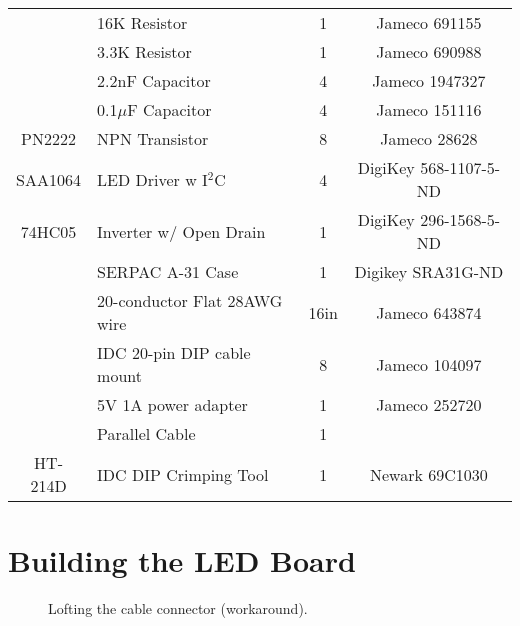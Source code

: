 \documentclass[11pt]{article}
\begin{document}
\begin{tabular}{|c|l|c|c|}
	  & 16K Resistor               & 1  &  Jameco 691155 \\ %
	  & 3.3K Resistor              & 1  &  Jameco 690988 \\ %
	  & 2.2nF Capacitor            & 4  &  Jameco 1947327 \\ %
	  & 0.1$\mu$F Capacitor        & 4  &  Jameco 151116 \\ %
PN2222    & NPN Transistor             & 8  &  Jameco 28628 \\ %
SAA1064   & LED Driver w I$^{2}$C      & 4  &  DigiKey 568-1107-5-ND \\ %
74HC05    & Inverter w/ Open Drain     & 1  &  DigiKey 296-1568-5-ND \\ %


\hline
\hline
          & SERPAC A-31 Case           & 1   & Digikey SRA31G-ND \\ %
	  & 20-conductor Flat 28AWG wire & 16in & Jameco 643874 \\ %
          & IDC 20-pin DIP cable mount & 8   & Jameco 104097 \\ %
	  & 5V 1A power adapter        & 1   & Jameco 252720 \\ %
	  & Parallel Cable             & 1   & \\
HT-214D   & IDC DIP Crimping Tool      & 1   & Newark 69C1030 \\ %
\hline

\end{tabular}


\section{Building the LED Board}

\begin{figure*}[tbp]
\begin{center}
\caption{Lofting the cable connector (workaround).}
\label{figure:cableloft}
\end{center}
\end{figure*}
\end{document}
